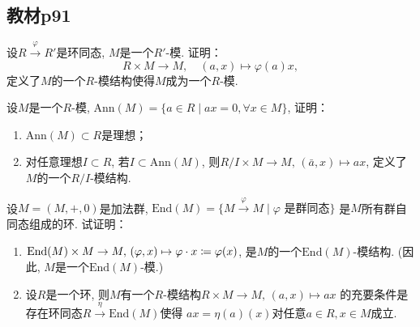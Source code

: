 \subsection{教材p91}

\begin{problem}
    设$R \xrightarrow{\varphi} R'$是环同态, $M$是一个$R'$-模.
证明：
\[
    R \times M \to M,\quad (a, x) \mapsto \varphi(a)x,
\]
定义了$M$的一个$R$-模结构使得$M$成为一个$R$-模.
\end{problem}

\begin{solution}
    
\end{solution}

\begin{problem}
    设$M$是一个$R$-模, $\mathrm{Ann}(M) = \{a \in R \mid ax = 0, \forall x \in M\}$,
证明：
\begin{enumerate}[(1)]
    \item $\mathrm{Ann}(M) \subset R$是理想；
    \item 对任意理想$I \subset R$, 若$I \subset \mathrm{Ann}(M)$,
则$R/I \times M \to M,\, (\bar{a},x) \mapsto ax$,
定义了$M$的一个$R/I$-模结构.
\end{enumerate}
\end{problem}

\begin{solution}
    
\end{solution}

\begin{problem}
    设$M = (M, +, 0)$是加法群, $\mathrm{End}(M) = \{M \xrightarrow{\varphi} M \mid \varphi \text{ 是群同态}\}$
    是$M$所有群自同态组成的环. 试证明：
\begin{enumerate}[(1)]
    \item $\mathrm{End}(M) \times M \to M,\, (\varphi, x) \mapsto \varphi \cdot x \mathrel{\coloneqq} \varphi(x)$,
是$M$的一个$\mathrm{End}(M)$-模结构. (因此, $M$是一个$\mathrm{End}(M)$-模.)
    \item 设$R$是一个环, 则$M$有一个$R$-模结构$R \times M \to M,\, (a, x) \mapsto ax$
的充要条件是存在环同态$R \xrightarrow{\eta} \mathrm{End}(M)$使得
$ax = \eta(a)(x)$对任意$a \in R, x \in M$成立.
\end{enumerate}
\end{problem}

\begin{solution}

\end{solution}

